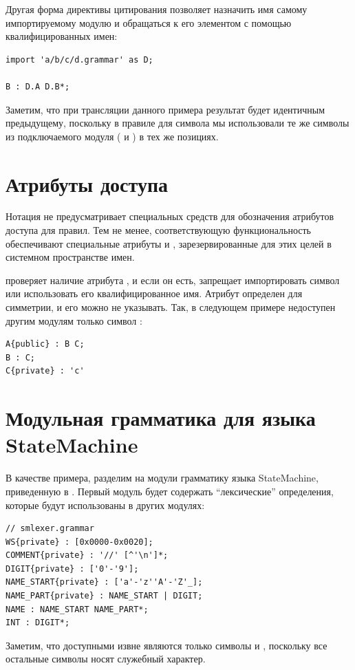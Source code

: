 Другая форма директивы цитирования позволяет назначить имя самому импортируемому модулю и обращаться к его элементом с помощью квалифицированных имен:
\begin{lstlisting}
import 'a/b/c/d.grammar' as D;

B : D.A D.B*;
\end{lstlisting}  
Заметим, что при трансляции данного примера результат будет идентичным предыдущему, поскольку в правиле для символа  мы использовали те же символы из подключаемого модуля ( и ) в тех же позициях.

\section{Атрибуты доступа}

Нотация  не предусматривает специальных средств для обозначения атрибутов доступа для правил. Тем не менее, соответствующую функциональность обеспечивают специальные атрибуты  и , зарезервированные для этих целей в системном пространстве имен.

 проверяет наличие атрибута , и если он есть, запрещает импортировать символ или использовать его квалифицированное имя. Атрибут  определен для симметрии, и его можно не указывать. Так, в следующем примере недоступен другим модулям только символ :
\begin{lstlisting}
A{public} : B C;
B : C;
C{private} : 'c'
\end{lstlisting}  

\section{Модульная грамматика для языка StateMachine}\label{ModularSMG}

В качестве примера, разделим на модули грамматику языка StateMachine, приведенную в . Первый модуль  будет содержать ``лексические'' определения, которые будут использованы в других модулях:
\begin{lstlisting}
// smlexer.grammar
WS{private} : [0x0000-0x0020];
COMMENT{private} : '//' [^'\n']*;
DIGIT{private} : ['0'-'9'];
NAME_START{private} : ['a'-'z''A'-'Z'_];
NAME_PART{private} : NAME_START | DIGIT;
NAME : NAME_START NAME_PART*;
INT : DIGIT*;
\end{lstlisting}
Заметим, что доступными извне являются только символы  и , поскольку все остальные символы носят служебный характер.

